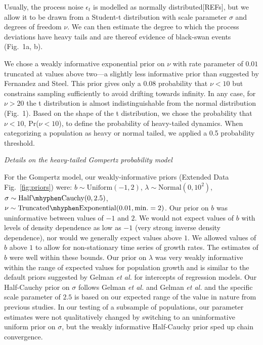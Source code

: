 Usually, the process noise \(\epsilon_{t}\) is modelled as normally distributed{[}REFs{]}, but we allow it to be drawn from a Student-t distribution with scale parameter \(\sigma\) and degrees of freedom \(\nu\). We can then estimate the degree to which the process deviations have heavy tails and are thereof evidence of black-swan events (Fig.~1a, b).

We chose a weakly informative exponential prior on \(\nu\) with rate parameter of \(0.01\) truncated at values above two---a slightly less informative prior than suggested by Fernandez and Steel\cite{fernandez1998}. This prior gives only a \(0.08\) probability that \(\nu < 10\) but constrains sampling sufficiently to avoid drifting towards infinity. In any case, for \(\nu > 20\) the t distribution is almost indistinguishable from the normal distribution (Fig.~1). Based on the shape of the t distribution, we chose the probability that \(\nu < 10\), Pr(\(\nu < 10\)), to define the probability of heavy-tailed dynamics. When categorizing a population as heavy or normal tailed, we applied a 0.5 probability threshold.

\emph{Details on the heavy-tailed Gompertz probability model}

For the Gompertz model, our weakly-informative priors (Extended Data Fig.~\ref{fig:priors}) were: \(b \sim \mathrm{Uniform}(-1, 2)\), \(\lambda \sim \mathrm{Normal}(0, 10^2)\), \(\sigma \sim \mathrm{Half\mhyphen Cauchy} (0, 2.5)\), \(\nu \sim \mathrm{Truncated\mhyphen Exponential}(0.01, \mathrm{min.} = 2)\). Our prior on \(b\) was uninformative between values of \(-1\) and \(2\). We would not expect values of \(b\) with levels of density dependence as low as \(-1\) (very strong inverse density dependence), nor would we generally expect values above \(1\). We allowed values of \(b\) above \(1\) to allow for non-stationary time series of growth rates. The estimates of \(b\) were well within these bounds. Our prior on \(\lambda\) was very weakly informative within the range of expected values for population growth and is similar to the default priors suggested by Gelman \emph{et al.}\cite{gelman2008d} for intercepts of regression models. Our Half-Cauchy prior on \(\sigma\) follows Gelman \emph{et al.}\cite{gelman2006c} and Gelman \emph{et al.}\cite{gelman2008d} and the specific scale parameter of \(2.5\) is based on our expected range of the value in nature from previous studies\cite{connors2014}. In our testing of a subsample of populations, our parameter estimates were not qualitatively changed by switching to an uninformative uniform prior on \(\sigma\), but the weakly informative Half-Cauchy prior sped up chain convergence.

